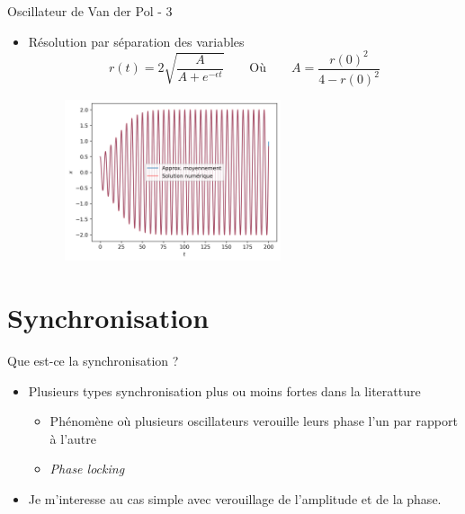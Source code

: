   \begin{frame}{Oscillateur de Van der Pol - 3}
    \begin{itemize}
      \item Résolution par séparation des variables
      \begin{equation*}
        r(t) = 2 \sqrt{ \frac{A}{A + e^{-\epsilon t}} }
        \qquad
        \text{Où}
        \qquad 
        A = \frac{r(0)^2}{4 - r(0)^2}
      \end{equation*}
      \begin{figure}
        \includegraphics[width=0.6\textwidth]{images/vdp/vdp_approx_transient.png}
      \end{figure}
    \end{itemize}
  \end{frame}


\section{Synchronisation}
\begin{frame}{Que est-ce la synchronisation ?}
  \begin{itemize}
    \item Plusieurs types synchronisation plus ou moins fortes dans la literatture
    \begin{itemize}
      \item Phénomène où plusieurs oscillateurs verouille leurs phase l'un par rapport à l'autre \cite{matheny_phase_2014}
      \item \emph{Phase locking}
    \end{itemize}
    \item Je m'interesse au cas simple avec verouillage de l'amplitude et de la phase.
  \end{itemize}
\end{frame}

